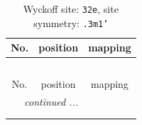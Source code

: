 \documentclass[fleqn,8pt]{jsarticle}
\begin{document}
\renewcommand{\arraystretch}{1.2}
\begin{longtable}{ccc}
\caption{Wyckoff site: {\tt 32e}, site symmetry: {\tt .3m1'}}
 \\
 \hline \hline
No. & position & mapping \\ \hline \endfirsthead

\multicolumn{2}{l}{\tablename\ \thetable{}} \\
 \hline \hline
No. & position & mapping \\ \hline \endhead

 \hline \hline
\multicolumn{2}{r}{\footnotesize\it continued ...} \\ \endfoot

 \hline \hline
\multicolumn{2}{r}{} \\ \endlastfoot


\end{longtable}
\end{document}
